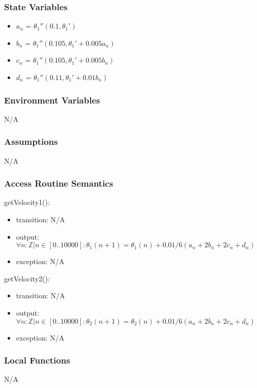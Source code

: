\documentclass[12pt, titlepage]{article}
\begin{document}
\subsubsection{State Variables}
\begin{itemize}
  \item $a_n$ = ${\theta_1}''(0.1,{\theta_1}')$ 
  \item $b_n$ = ${\theta_1}''(0.105,{\theta_1}'+0.005a_n)$
  \item $c_n$ = ${\theta_1}''(0.105,{\theta_1}'+0.005b_n)$
  \item $d_n$ = ${\theta_1}''(0.11,{\theta_1}'+0.01b_n)$

\end{itemize}
\subsubsection{Environment Variables}

N/A
\subsubsection{Assumptions}

N/A
\subsubsection{Access Routine Semantics}

\noindent getVelocity1():
\begin{itemize}
\item transition: N/A 
\item output: $\forall n: \mathbb{Z}| n \in[0..10000]: \theta_1(n+1) = \theta_1(n) + 0.01/6(a_n+2b_n+2c_n+d_n) $
\item exception: N/A
\end{itemize}

\noindent getVelocity2():
\begin{itemize}
\item transition: N/A 
\item output: $\forall n: \mathbb{Z}| n \in[0..10000]: \theta_2(n+1) = \theta_2(n) + 0.01/6(a_n+2b_n+2c_n+d_n) $
\item exception: N/A
\end{itemize}

\subsubsection{Local Functions}

N/A
\newpage
\end{document}

